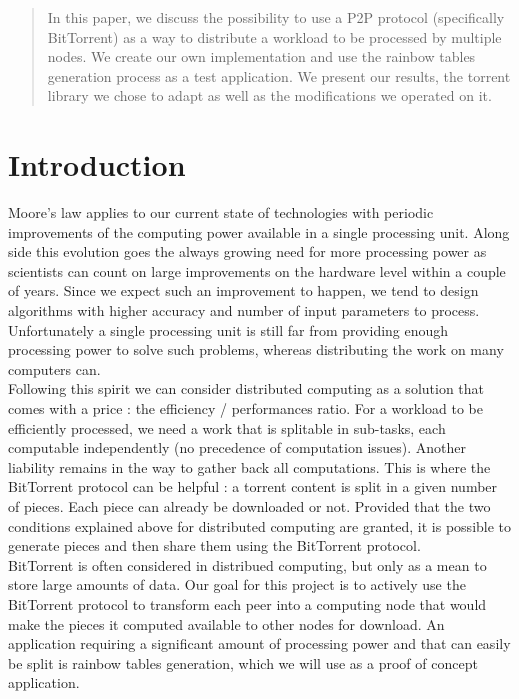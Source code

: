 \documentclass[a4paper]{article}
\begin{document}
{\begin{abstract}
In this paper, we discuss the possibility to use a P2P protocol (specifically BitTorrent) as a way to distribute a workload to be processed by multiple nodes. We create our own implementation and use the rainbow tables generation process as a test application. We present our results, the torrent library we chose to adapt as well as the modifications we operated on it.
\end{abstract}
\vspace{2mm}

\section{Introduction}

Moore's law applies to our current state of technologies with periodic improvements of the computing power available in a single processing unit. Along side this evolution goes the always growing need for more processing power as scientists can count on large improvements on the hardware level within a couple of years. Since we expect such an improvement to happen, we tend to design algorithms with higher accuracy and number of input parameters to process. Unfortunately a single processing unit is still far from providing enough processing power to solve such problems, whereas distributing the work on many computers can.\\

Following this spirit we can consider distributed computing as a solution that comes with a price : the efficiency / performances ratio. For a workload to be efficiently processed, we need a work that is splitable in sub-tasks, each computable independently (no precedence of computation issues). Another liability remains in the way to gather back all computations. This is where the BitTorrent protocol can be helpful : a torrent content is split in a given number of pieces. Each piece can already be downloaded or not. Provided that the two conditions explained above for distributed computing are granted, it is possible to generate pieces and then share them using the BitTorrent protocol.\\

BitTorrent is often considered in distribued computing, but only as a mean to store large amounts of data. Our goal for this project is to actively use the BitTorrent protocol to transform each peer into a computing node that would make the pieces it computed available to other nodes for download. An application requiring a significant amount of processing power and that can easily be split is rainbow tables generation, which we will use as a proof of concept application.\\

}
\end{document}
